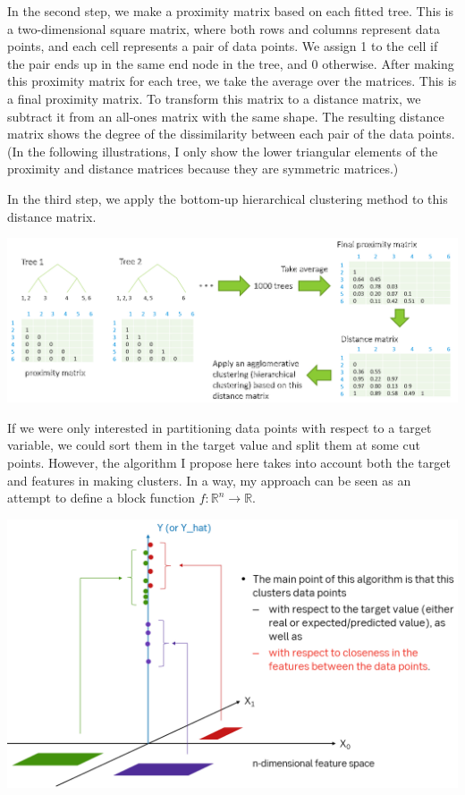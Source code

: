 \documentclass{article}
\begin{document}
In the second step, we make a proximity matrix based on each fitted tree. This is a two-dimensional square matrix, where both rows and columns represent data points, and each cell represents a pair of data points. We assign 1 to the cell if the pair ends up in the same end node in the tree, and 0 otherwise. After making this proximity matrix for each tree, we take the average over the matrices. This is a final proximity matrix. To transform this matrix to a distance matrix, we subtract it from an all-ones matrix with the same shape. The resulting distance matrix shows the degree of the dissimilarity between each pair of the data points. (In the following illustrations, I only show the lower triangular elements of the proximity and distance matrices because they are symmetric matrices.)

In the third step, we apply the bottom-up hierarchical clustering method to this distance matrix.

\includegraphics[width=1\textwidth]{supervised_clustering}

If we were only interested in partitioning data points with respect to a target variable, we could sort them in the target value and split them at some cut points. However, the algorithm I propose here takes into account both the target and features in making clusters. In a way, my approach can be seen as an attempt to define a block function $f:\mathbb{R}^n\rightarrow\mathbb{R}$.

\includegraphics[width=1\textwidth]{block_function}
\end{document}
